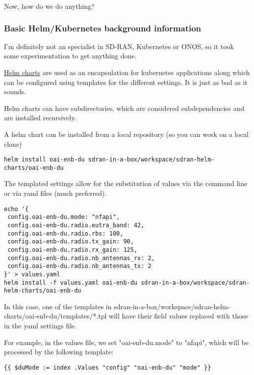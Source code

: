 \documentclass{article}
\begin{document}
            Now, how do we do anything?

        \subsubsection{Basic Helm/Kubernetes background information}
            I'm definitely not an specialist in SD-RAN, Kubernetes or ONOS,
            so it took some experimentation to get anything done.

            \href{https://helm.sh/docs/intro/using\_helm/}{Helm charts} are used as an encapsulation
            for kubernetes applications along which can be configured using templates for the
            different settings. It is just as bad as it sounds.

            Helm charts can have subdirectories, which are considered subdependencies and are installed recursively.

            A helm chart can be installed from a local repository (so you can work on a local clone)

\begin{verbatim}
helm install oai-enb-du sdran-in-a-box/workspace/sdran-helm-charts/oai-enb-du
\end{verbatim}

            The templated settings allow for the substitution of values via the command line
            or via yaml files (much preferred).

\begin{verbatim}
echo '{
 config.oai-enb-du.mode: "nfapi",
 config.oai-enb-du.radio.eutra_band: 42,
 config.oai-enb-du.radio.rbs: 100,
 config.oai-enb-du.radio.tx_gain: 90,
 config.oai-enb-du.radio.rx_gain: 125,
 config.oai-enb-du.radio.nb_antennas_rx: 2,
 config.oai-enb-du.radio.nb_antennas_tx: 2
}' > values.yaml
helm install -f values.yaml oai-enb-du sdran-in-a-box/workspace/sdran-helm-charts/oai-enb-du
\end{verbatim}

            In this case, one of the templates in sdran-in-a-box/workspace/sdran-helm-charts/oai-enb-du/templates/*.tpl
            will have their field values replaced with those in the yaml settings file.

            For example, in the values file, we set "oai-enb-du.mode" to "nfapi", which will be processed
            by the following template:

\begin{verbatim}
{{ $duMode := index .Values "config" "oai-enb-du" "mode" }}
\end{verbatim}
\end{document}
